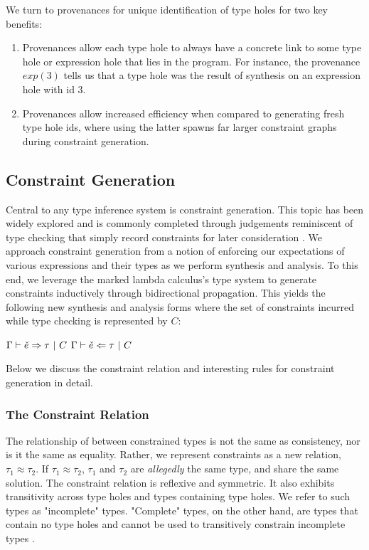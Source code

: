 We turn to provenances for unique identification of type holes for two key benefits:
\begin{enumerate}
    \item Provenances allow each type hole to always have a concrete link to some type hole or expression hole that lies in the program. For instance, the provenance $exp(3)$ tells us that a type hole was the result of synthesis on an expression hole with id 3.
    \item Provenances allow increased efficiency when compared to generating fresh type hole ids, where using the latter spawns far larger constraint graphs during constraint generation.
\end{enumerate}

\subsection{Constraint Generation}
Central to any type inference system is constraint generation. This topic has been widely explored and is commonly completed through judgements reminiscent of type checking that simply record constraints for later consideration \cite{TAPL}. We approach constraint generation from a notion of enforcing our expectations of various expressions and their types as we perform synthesis and analysis. To this end, we leverage the marked lambda calculus's type system to generate constraints inductively through bidirectional propagation. This yields the following new synthesis and analysis forms where the set of constraints incurred while type checking is represented by $C$:
\begin{center}
    $\Gamma \vdash \check{e} \Rightarrow \tau ~|~ C$ \hspace{3cm} $\Gamma \vdash \check{e} \Leftarrow \tau ~|~ C$
\end{center}
Below we discuss the constraint relation and interesting rules for constraint generation in detail.

\subsubsection{The Constraint Relation}
The relationship of between constrained types is not the same as consistency, nor is it the same as equality. Rather, we represent constraints as a new relation, $\tau_1 \approx \tau_2$. If $\tau_1 \approx \tau_2$, $\tau_1$ and $\tau_2$ are \textit{allegedly} the same type, and share the same solution. The constraint relation is reflexive and symmetric. It also exhibits transitivity across type holes and types containing type holes. We refer to such types as "incomplete" types. "Complete" types, on the other hand, are types that contain no type holes and cannot be used to transitively constrain incomplete types \cite{HazelnutPOPL}.

